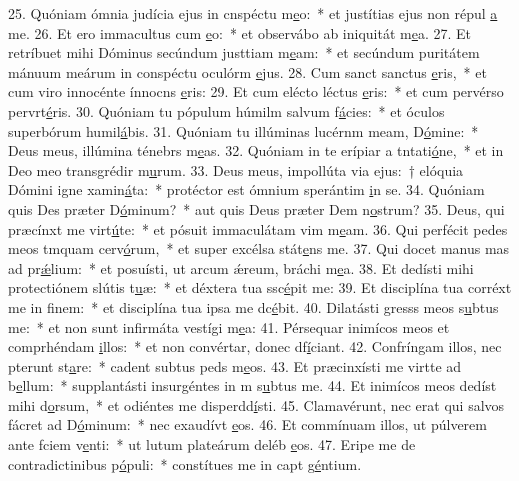 25. Quóniam ómnia judícia ejus in cnspéctu m\uline{e}o:~* et justítias ejus non répul \uline{a} me.
26. Et ero immacultus cum \uline{e}o:~* et observábo ab iniquitát m\uline{e}a.
27. Et retríbuet mihi Dóminus secúndum justtiam m\uline{e}am:~* et secúndum puritátem mánuum meárum in conspéctu oculórm \uline{e}jus.
28. Cum sanct sanctus \uline{e}ris,~* et cum viro innocénte ínnocns \uline{e}ris:
29. Et cum elécto léctus \uline{e}ris:~* et cum pervérso pervrt\uline{é}ris.
30. Quóniam tu pópulum húmilm salvum f\uline{á}cies:~* et óculos superbórum humil\uline{á}bis.
31. Quóniam tu illúminas lucérnm meam, D\uline{ó}mine:~* Deus meus, illúmina ténebrs m\uline{e}as.
32. Quóniam in te erípiar a tntati\uline{ó}ne,~* et in Deo meo transgrédir m\uline{u}rum.
33. Deus meus, impollúta via ejus:~† elóquia Dómini igne xamin\uline{á}ta:~* protéctor est ómnium sperántim \uline{i}n se.
34. Quóniam quis Des præter D\uline{ó}minum?~* aut quis Deus præter Dem n\uline{o}strum?
35. Deus, qui præcínxt me virt\uline{ú}te:~* et pósuit immaculátam vim m\uline{e}am.
36. Qui perfécit pedes meos tmquam cerv\uline{ó}rum,~* et super excélsa stát\uline{e}ns me.
37. Qui docet manus mas ad pr\uline{ǽ}lium:~* et posuísti, ut arcum ǽreum, bráchi m\uline{e}a.
38. Et dedísti mihi protectiónem slútis t\uline{u}æ:~* et déxtera tua ssc\uline{é}pit me:
39. Et disciplína tua corréxt me in f\uline{i}nem:~* et disciplína tua ipsa me dc\uline{é}bit.
40. Dilatásti gresss meos s\uline{u}btus me:~* et non sunt infirmáta vestígi m\uline{e}a:
41. Pérsequar inimícos meos et comprhéndam \uline{i}llos:~* et non convértar, donec df\uline{í}ciant.
42. Confríngam illos, nec pterunt st\uline{a}re:~* cadent subtus peds m\uline{e}os.
43. Et præcinxísti me virtte ad b\uline{e}llum:~* supplantásti insurgéntes in m s\uline{u}btus me.
44. Et inimícos meos dedíst mihi d\uline{o}rsum,~* et odiéntes me disperdd\uline{í}sti.
45. Clamavérunt, nec erat qui salvos fácret ad D\uline{ó}minum:~* nec exaudívt \uline{e}os.
46. Et commínuam illos, ut púlverem ante fciem v\uline{e}nti:~* ut lutum plateárum deléb \uline{e}os.
47. Eripe me de contradictinibus p\uline{ó}puli:~* constítues me in capt g\uline{é}ntium.
